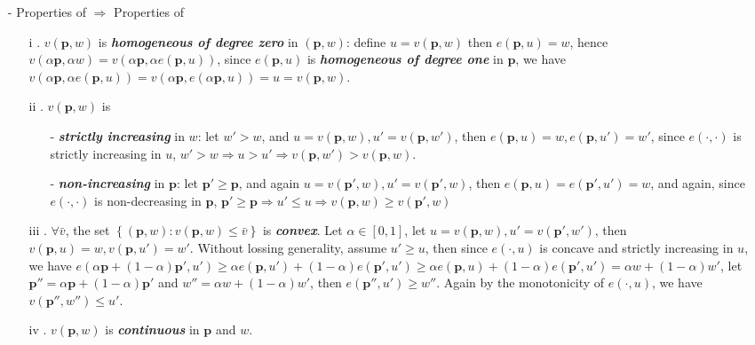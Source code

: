 \begin{enumerate}
    \item[-] Properties  of $\Rightarrow$ Properties of  
    \begin{enumerate}
        \item[i] . $v(\mathbf{p},w)$ is \textit{\textbf{homogeneous of degree zero}} in $(\mathbf{p},w)$: define $u=v(\mathbf{p},w)$ then $e(\mathbf{p},u)=w$, hence $v(\alpha\mathbf{p},\alpha w)=v(\alpha\mathbf{p},\alpha e(\mathbf{p},u))$, since $e(\mathbf{p},u)$ is \textit{\textbf{homogeneous of degree one}} in $\mathbf{p}$, we have $v(\alpha \mathbf{p},\alpha e(\mathbf{p},u))=v(\alpha\mathbf{p},e(\alpha \mathbf{p},u))=u=v(\mathbf{p},w)$.
        \item[ii] . $v(\mathbf{p},w)$ is
        \begin{enumerate}
            \item[-] \textit{\textbf{strictly increasing}} in $w$: let $w'>w$, and $u=v(\mathbf{p},w),u'=v(\mathbf{p},w')$, then $e(\mathbf{p},u)=w,e(\mathbf{p},u')=w'$, since $e(\cdot,\cdot)$ is strictly increasing in $u$, $w'>w\Rightarrow u>u'\Rightarrow v(\mathbf{p},w')>v(\mathbf{p},w)$.
            \item[-] \textit{\textbf{non-increasing}} in $\mathbf{p}$: let $\mathbf{p}'\geq \mathbf{p}$, and again $u=v(\mathbf{p}',w),u'=v(\mathbf{p}',w)$, then $e(\mathbf{p},u)=e(\mathbf{p}',u')=w$, and again, since $e(\cdot,\cdot)$ is non-decreasing in $\mathbf{p}$, $\mathbf{p}'\geq \mathbf{p}\Rightarrow u'\leq u\Rightarrow v(\mathbf{p},w)\geq v(\mathbf{p}',w)$
        \end{enumerate}
        \item[iii] . $\forall \bar{v}$, the set $\left\{(\mathbf{p},w):v(\mathbf{p},w)\leq \bar{v}\right\}$ is \textit{\textbf{convex}}. Let $\alpha \in[0,1]$, let $u=v(\mathbf{p},w),u'=v(\mathbf{p}',w')$, then $v(\mathbf{p},u)=w,v(\mathbf{p},u')=w'$. Without lossing generality, assume $u'\geq u$, then since $e(\cdot,u)$ is concave and strictly increasing in $u$, 
        we have $e(\alpha\mathbf{p}+(1-\alpha)\mathbf{p}',u')\geq \alpha e(\mathbf{p},u')+(1-\alpha)e(\mathbf{p}',u')\geq \alpha e(\mathbf{p},u)+(1-\alpha)e(\mathbf{p}',u')=\alpha w+(1-\alpha)w' $, let $\mathbf{p}''=\alpha\mathbf{p}+(1-\alpha)\mathbf{p}'$ and $w''=\alpha w+(1-\alpha)w'$, then $e(\mathbf{p}'',u')\geq w''$. Again by the monotonicity of $e(\cdot,u)$, we have $v(\mathbf{p}'',w'')\leq u'$.
        \item[iv] . $v(\mathbf{p},w)$ is \textit{\textbf{continuous}} in $\mathbf{p}$ and $w$.
    \end{enumerate} 
\end{enumerate}



